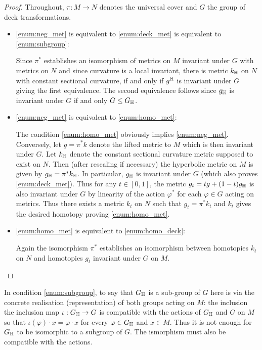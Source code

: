 \documentclass[a4paper, 12pt]{amsart}
\begin{document}
\begin{proof}
Throughout, \(\pi : M \to N\) denotes the universal cover and \(G\) the group of deck transformations.

\begin{itemize}
\item \ref{enum:neg_met} is equivalent to \ref{enum:deck_met} is equivalent to \ref{enum:subgroup}:

Since \(\pi^{\ast}\) establishes an isomorphism of metrics on \(M\) invariant under \(G\) with metrics on \(N\) and since curvature is a local invariant, there is metric \(k_{\mathbb{H}}\) on \(N\) with constant sectional curvature, if and only if \(g^{\mathbb{H}}\) is invariant under \(G\) giving the first equivalence. The second equivalence follows since \(g_{\mathbb{H}}\) is invariant under \(G\) if and only \(G \leq G_{\mathbb{H}}\).

\item \ref{enum:neg_met} is equivalent to \ref{enum:homo_met}:

The condition \ref{enum:homo_met} obviously implies \ref{enum:neg_met}. Conversely, let \(g = \pi^{\ast} k\) denote the lifted metric to \(M\) which is then invariant under \(G\). Let \(k_{\mathbb{H}}\) denote the constant sectional curvature metric supposed to exist on \(N\). Then (after rescaling if necessary) the hyperbolic metric on \(M\) is given by \(g_{\mathbb{H}} = \pi^{\ast} k_{\mathbb{H}}\). In particular, \(g_{\mathbb{H}}\)  is invariant under \(G\) (which also proves \ref{enum:deck_met}). Thus for any \(t \in [0, 1]\), the metric \(g_t = t g + (1-t) g_{\mathbb{H}}\) is also invariant under \(G\) by linearity of the action \(\varphi^{\ast}\) for each \(\varphi \in G\) acting on metrics. Thus there exists a metric \(k_t\) on \(N\) such that \(g_t = \pi^{\ast} k_t\) and \(k_t\) gives the desired homotopy proving \ref{enum:homo_met}.

\item \ref{enum:homo_met} is equivalent to \ref{enum:homo_deck}:

Again the isomorphism \(\pi^{\ast}\) establishes an isomorphism between homotopies \(k_t\) on \(N\) and homotopies \(g_t\) invariant under \(G\) on \(M\).
\end{itemize}
\end{proof}

\begin{rem}
In condition \ref{enum:subgroup}, to say that \(G_{\mathbb{H}}\) is a sub-group of \(G\) here is via the concrete realisation (representation) of both groups acting on \(M\): the inclusion the inclusion map \(\iota : G_{\mathbb{H}} \to G\) is compatible with the actions of \(G_{\mathbb{H}}\) and \(G\) on \(M\) so that \(\iota(\varphi) \cdot x = \varphi \cdot x\) for every \(\varphi \in G_{\mathbb{H}}\) and \(x \in M\). Thus it is not enough for \(G_{\mathbb{H}}\) to be isomorphic to a subgroup of \(G\). The ismorphism must also be compatible with the actions.
\end{rem}
\end{document}
